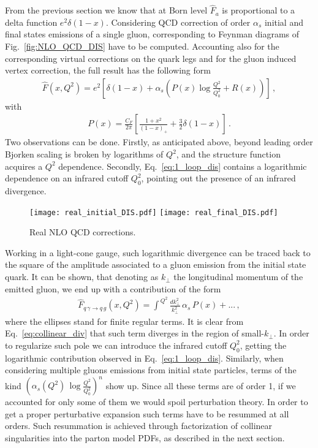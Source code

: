 %
From the previous section we know that at Born level $\hat{F}_a$ is proportional
to a delta function $e^2\delta\left(1-x\right)$. 
Considering QCD correction of order $\alpha_s$
initial and final states emissions of a single gluon, corresponding to Feynman diagrams of Fig.~\eqref{fig:NLO_QCD_DIS}
have to be computed. 
Accounting also for the corresponding virtual corrections on the quark legs
and for the gluon induced vertex correction, the full result has the following form
\begin{align}
    \label{eq:1_loop_dis}
    \hat{F}\left(x,Q^2\right) = e^2\left[\delta\left(1-x\right) 
    + \alpha_s\left(P\left(x\right)\log\frac{Q^2}{Q_0^2} + R\left(x\right) \right)  \right]\,,
\end{align}
with
\begin{align}
    \label{eq:splitting_function}
    P\left(x\right) = \frac{C_F}{2\pi}\left[\frac{1+x^2}{\left(1-x\right)_+} + \frac{3}{2}\delta\left(1-x\right)\right]\,.
\end{align}
Two observations can be done. Firstly, as anticipated above, beyond leading order
Bjorken scaling is broken by logarithms of $Q^2$, and the structure function acquires a $Q^2$ dependence.
Secondly, Eq.~\eqref{eq:1_loop_dis} contains a logarithmic dependence on an infrared cutoff $Q_0^2$, pointing out 
the presence of an infrared divergence.
\begin{figure}[h]
    \centering
    \texttt{[image: real\_initial\_DIS.pdf]}
    \texttt{[image: real\_final\_DIS.pdf]}
    \caption{Real NLO QCD corrections.}
    \label{fig:NLO_QCD_DIS}
\end{figure}

%
Working in a light-cone gauge, such logarithmic divergence can be traced back to the square of the amplitude associated
to a gluon emission from the initial state quark.
It can be shown, that denoting as $k_{\perp}$ the longitudinal momentum of the emitted gluon,
we end up with a contribution of the form
\begin{align}
    \label{eq:collinear_div}
    \hat{F}_{q\, \gamma \rightarrow q\,g}\left(x,Q^2\right) =
    \int^{\,Q^2}\frac{dk_{\perp}^2}{k_{\perp}^2}\, \alpha_s\, P\left(x\right) + ...\,,
\end{align}
where the ellipses stand for finite regular terms.
It is clear from Eq.~\eqref{eq:collinear_div} that such term diverges in the region of small-$k_{\perp}$.
In order to regularize such pole we can introduce the infrared cutoff $Q_0^2$, getting the logarithmic 
contribution observed in Eq.~\eqref{eq:1_loop_dis}.
Similarly, when considering multiple gluons emissions from initial state particles, terms of the kind 
$\left(\alpha_s\left(Q^2\right)\,\log\frac{Q^2}{Q_0^2}\right)^n$ show up.
Since all these terms are of order 1, if we accounted for only some of them we would spoil perturbation theory.
In order to get a proper perturbative expansion such terms have to be resummed at all orders.
Such resummation is achieved through factorization of collinear singularities into the parton model PDFs,
as described in the next section.

